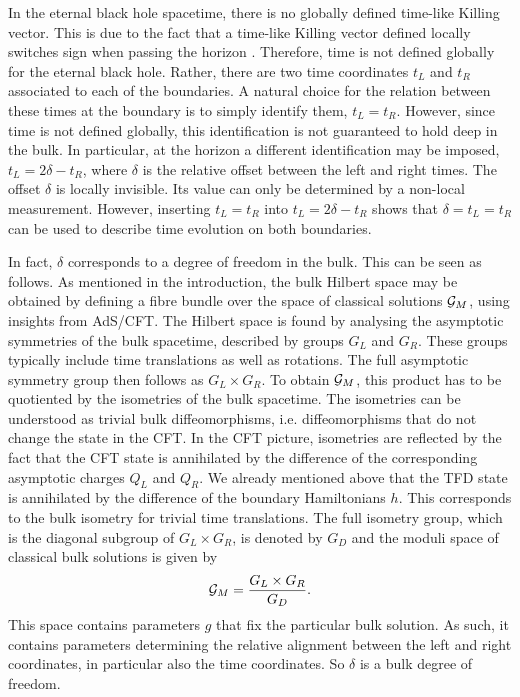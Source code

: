 \documentclass[a4paper,11pt]{article}
\newcommand{\1}{\mathds{1}}
\begin{document}
In the eternal black hole spacetime, there is no globally defined time-like Killing vector. This is due to the fact that a time-like Killing vector defined locally switches sign when passing the horizon \cite{Verlinde:2020upt}. Therefore, time is not defined globally for the eternal black hole. Rather, there are two time coordinates $t_L$ and $t_R$ associated to each of the boundaries. A natural choice for the relation between these times at the boundary is to simply identify them, $t_L=t_R$. However, since time is not defined globally, this identification is not guaranteed to hold deep in the bulk. In particular, at the horizon a different identification may be imposed, $t_L=2\delta-t_R$, where $\delta$ is the relative offset between the left and right times. The offset $\delta$ is locally invisible. Its value can only be determined by a non-local measurement. However, inserting $t_L=t_R$ into $t_L=2\delta-t_R$ shows that $\delta=t_L=t_R$ can be used to describe time evolution on both boundaries.

In fact, $\delta$ corresponds to a degree of freedom in the bulk. This can be seen as follows. As mentioned in the introduction, the bulk Hilbert space may be obtained by defining a fibre bundle over the space of classical solutions ${\cal G}_M$, using insights from AdS/CFT.  The Hilbert space is found by analysing the asymptotic symmetries of the bulk spacetime, described by groups $G_L$ and $G_R$. These groups typically include time translations as well as rotations. The full asymptotic symmetry group then follows as $G_L\times G_R$. To obtain ${\cal G}_M$, this product has to be quotiented by the isometries of the bulk spacetime. The isometries can be understood as trivial bulk diffeomorphisms, i.e. diffeomorphisms that do not change the state in the CFT. In the CFT picture, isometries are reflected by the fact that the CFT state is annihilated by the difference of the corresponding asymptotic charges $Q_L$ and $Q_R$. We already mentioned above that the TFD state is annihilated by the difference of the boundary Hamiltonians $h$. This corresponds to the bulk isometry for trivial time translations. The full isometry group, which is the diagonal subgroup of $G_L\times G_R$, is denoted by $G_D$ and the moduli space of classical bulk solutions is given by
\begin{align}
    {\cal G}_M=\frac{G_L\times G_R}{G_D}.\label{eq:ModuliSpace}
\end{align}
This space contains parameters $g$ that fix the particular bulk solution. As such, it contains parameters determining the relative alignment between the left and right coordinates, in particular also the time coordinates. So $\delta$ is a bulk degree of freedom.
\end{document}
